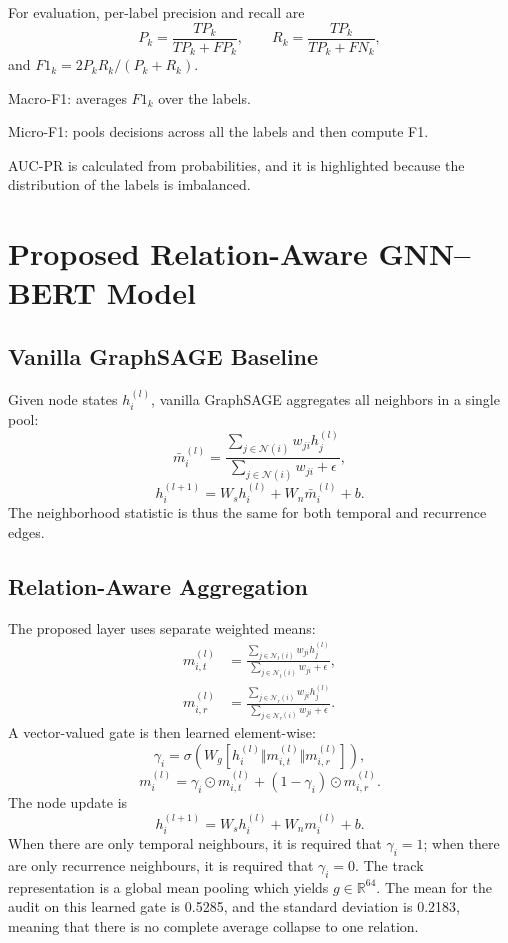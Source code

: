 \documentclass[conference]{IEEEtran}
\begin{document}
For evaluation, per-label precision and recall are
\begin{equation}
P_k=\frac{TP_k}{TP_k+FP_k},\qquad R_k=\frac{TP_k}{TP_k+FN_k},
\end{equation}
and $F1_k=2P_kR_k/(P_k+R_k)$. 

Macro-F1: averages $F1_k$ over the labels. 

Micro-F1: pools decisions across all the labels and then compute F1. 

AUC-PR is calculated from probabilities, and it is highlighted because the distribution of the labels is imbalanced.

\section{Proposed Relation-Aware GNN--BERT Model}
\subsection{Vanilla GraphSAGE Baseline}
Given node states $h_i^{(l)}$, vanilla GraphSAGE aggregates all neighbors in a single pool:
\begin{equation}
\bar{m}_i^{(l)} = \frac{\sum_{j\in \mathcal{N}(i)} w_{ji} h_j^{(l)}}{\sum_{j\in \mathcal{N}(i)} w_{ji}+\epsilon},
\end{equation}
\begin{equation}
h_i^{(l+1)} = W_s h_i^{(l)} + W_n \bar{m}_i^{(l)} + b.
\end{equation}
The neighborhood statistic is thus the same for both temporal and recurrence edges.

\subsection{Relation-Aware Aggregation}
The proposed layer uses separate weighted means:
\begin{align}
m_{i,t}^{(l)} &= \frac{\sum_{j\in\mathcal{N}_{t}(i)}w_{ji}h_j^{(l)}}{\sum_{j\in\mathcal{N}_{t}(i)}w_{ji}+\epsilon},\\
m_{i,r}^{(l)} &= \frac{\sum_{j\in\mathcal{N}_{r}(i)}w_{ji}h_j^{(l)}}{\sum_{j\in\mathcal{N}_{r}(i)}w_{ji}+\epsilon}.
\end{align}
A vector-valued gate is then learned element-wise:
\begin{equation}
\gamma_i = \sigma\!\left(W_g[h_i^{(l)}\Vert m_{i,t}^{(l)}\Vert m_{i,r}^{(l)}]\right),
\end{equation}
\begin{equation}
m_i^{(l)} = \gamma_i\odot m_{i,t}^{(l)}+(1-\gamma_i)\odot m_{i,r}^{(l)}.
\end{equation}
The node update is
\begin{equation}
h_i^{(l+1)}=W_s h_i^{(l)}+W_n m_i^{(l)}+b.
\end{equation}
When there are only temporal neighbours, it is required that $\gamma_i=1$; when there are only recurrence neighbours, it is required that $\gamma_i=0$. The track representation is a global mean pooling which yields $g\in\mathbb{R}^{64}$. The mean for the audit on this learned gate is 0.5285, and the standard deviation is 0.2183, meaning that there is no complete average collapse to one relation.
\end{document}
